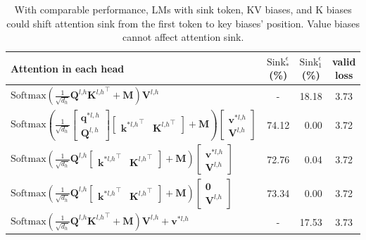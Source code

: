 \documentclass{article} \usepackage{iclr2025_conference,times}
\begin{document}
\begin{table}[t]
\vspace{-1.1cm}
\caption{With comparable performance, LMs with sink token, KV biases, and K biases could shift attention sink from the first token to key biases' position. Value biases cannot affect attention sink.}
\vspace{-.4cm}
\begin{center}
\begin{tabular}{l|ccc}
\toprule
 Attention in each head  &  $\textrm{Sink}_{*}^{\epsilon}$(\%) &  $\textrm{Sink}_1^{\epsilon}$(\%) &valid loss \\
\midrule
 $\textrm{Softmax}\left(\frac{1}{\sqrt{d_h}}\boldsymbol{Q}^{l\textrm{,}h}{\boldsymbol{K}^{l\textrm{,}h}}^\top+ \boldsymbol{M}\right)\boldsymbol{V}^{l\textrm{,}h}$ & - & 18.18 & 3.73 \\
 $\textrm{Softmax}\left(\frac{1}{\sqrt{d_h}}\begin{bmatrix}
    \boldsymbol{q}^{*l,h} \\
        \boldsymbol{Q}^{l,h}
    \end{bmatrix}\begin{bmatrix}
       {\boldsymbol{k}^{*l\textrm{,}h}}^\top & {\boldsymbol{K}^{l\textrm{,}h}}^\top
    \end{bmatrix}+ \boldsymbol{M}\right)\begin{bmatrix}
    \boldsymbol{v}^{*l\textrm{,}h} \\
    \boldsymbol{V}^{l\textrm{,}h}
\end{bmatrix}$ & 74.12 & \,\,\,0.00 &  3.72\\
 $\textrm{Softmax}\left(\frac{1}{\sqrt{d_h}}\boldsymbol{Q}^{l\textrm{,}h}\begin{bmatrix}
       {\boldsymbol{k}^{*l\textrm{,}h}}^\top & {\boldsymbol{K}^{l\textrm{,}h}}^\top
    \end{bmatrix}+ \boldsymbol{M}\right)\begin{bmatrix}
    \boldsymbol{v}^{*l\textrm{,}h} \\
    \boldsymbol{V}^{l\textrm{,}h}
\end{bmatrix}$ & 72.76 & \,\,\,0.04 & 3.72\\
 $\textrm{Softmax}\left(\frac{1}{\sqrt{d_h}}\boldsymbol{Q}^{l\textrm{,}h}\begin{bmatrix}
       {\boldsymbol{k}^{*l\textrm{,}h}}^\top & {\boldsymbol{K}^{l\textrm{,}h}}^\top
    \end{bmatrix}+ \boldsymbol{M}\right)\begin{bmatrix}
    \boldsymbol{0} \\
    \boldsymbol{V}^{l\textrm{,}h}
\end{bmatrix}$ & 73.34 & \,\,\,0.00 & 3.72 \\
 $\textrm{Softmax}\left(\frac{1}{\sqrt{d_h}}\boldsymbol{Q}^{l\textrm{,}h}{\boldsymbol{K}^{l\textrm{,}h}}^\top+ \boldsymbol{M}\right)\boldsymbol{V}^{l\textrm{,}h}+\boldsymbol{v}^{*l\textrm{,}h}$ & - & 17.53 & 3.73\\
\bottomrule
\end{tabular}
\end{center}
\vspace{-.2cm}
\label{bias}
\end{table}
\end{document}
